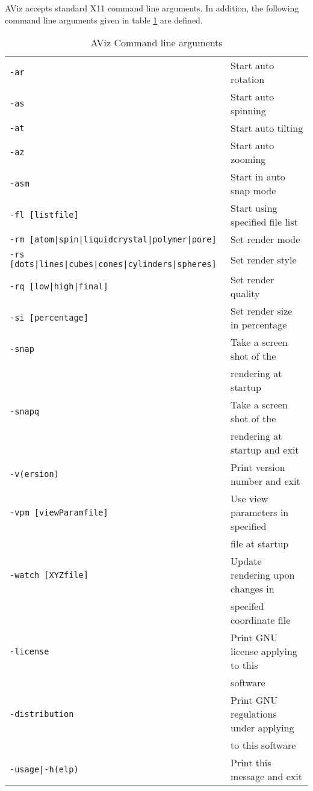 \documentclass[11pt]{article}
\begin{document}
AViz accepts standard X11 command line arguments.  In addition, the 
following command line arguments given in table \ref{tab1} are defined.

\begin{table}[h]
\begin{tabular}{|ll|}
\hline
{\tt -ar}   &  Start auto rotation \\
{\tt -as}   &  Start auto spinning \\
{\tt -at}   &  Start auto tilting \\
{\tt -az}   &  Start auto zooming \\
{\tt -asm}   & Start in auto snap mode\\
{\tt -fl [listfile]}   		& Start using specified file list \\
{\tt -rm [atom|spin|liquidcrystal|polymer|pore]} & Set render mode\\
{\tt -rs [dots|lines|cubes|cones|cylinders|spheres]} & Set render style \\
{\tt -rq [low|high|final]    } & Set render quality \\
{\tt -si [percentage]              } & Set render size in percentage \\
{\tt -snap 		           } & Take a screen shot of the \\
{                                  } & rendering at startup \\
{\tt -snapq 		           } & Take a screen shot of the \\
{                                  } & rendering at startup and exit\\
{\tt -v(ersion)                    } & Print version number and exit \\
{\tt -vpm [viewParamfile]          } & Use view parameters in specified \\
				     & file at startup \\
{\tt -watch [XYZfile]} 		     & Update rendering upon changes in \\
                                     & specifed coordinate file \\
{\tt -license} 				& Print GNU license applying to this \\
				     & software \\
{\tt -distribution} 		& Print GNU regulations under applying \\
				     & to this software \\
{\tt -usage|-h(elp)} 		& Print this message and exit \\
\hline
\end{tabular}
\label{tab1}
\caption{AViz Command line arguments}
\end{table}
\end{document}
